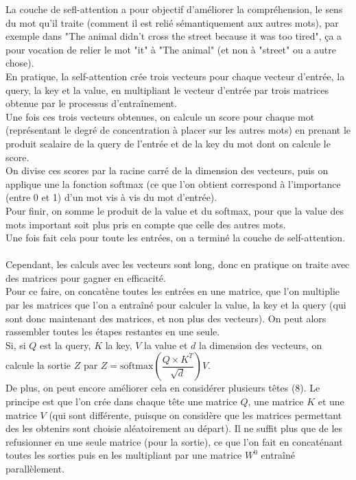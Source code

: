 \documentclass{article}
\begin{document}
La couche de sefl-attention a pour objectif d'améliorer la compréhension, le sens du mot qu'il traite (comment il est relié sémantiquement aux autres mots), par exemple dans "The animal didn’t cross the street because it was too tired", ça a pour vocation de relier le mot "it" à "The animal" (et non à "street" ou a autre chose).\\
En pratique, la self-attention crée trois vecteurs pour chaque vecteur d'entrée, la query, la key et la value, en multipliant le vecteur d'entrée par trois matrices obtenue par le processus d'entraînement.\\
Une fois ces trois vecteurs obtenues, on calcule un score pour chaque mot (représentant le degré de concentration à placer sur les autres mots) en prenant le produit scalaire de la query de l'entrée et de la key du mot dont on calcule le score.\\
On divise ces scores par la racine carré de la dimension des vecteurs, puis on applique une la fonction softmax (ce que l'on obtient correspond à l'importance (entre 0 et 1) d'un mot vis à vis du mot d'entrée).\\
Pour finir, on somme le produit de la value et du softmax, pour que la value des mots important soit plus pris en compte que celle des autres mots.\\
Une fois fait cela pour toute les entrées, on a terminé la couche de self-attention.\\
\\
Cependant, les calculs avec les vecteurs sont long, donc en pratique on traite avec des matrices pour gagner en efficacité.\\
Pour ce faire, on concatène toutes les entrées en une matrice, que l'on multiplie par les matrices que l'on a entraîné pour calculer la value, la key et la query (qui sont donc maintenant des matrices, et non plus des vecteurs). On peut alors rassembler toutes les étapes restantes en une seule.\\
Si, si $Q$ est la query, $K$ la key, $V$ la value et $d$ la dimension des vecteurs, on calcule la sortie $Z$ par $Z = \mathrm{softmax}(\dfrac{Q\times K^T}{\sqrt d})V$.\\
De plus, on peut encore améliorer cela en considérer plusieurs têtes ($8$). Le principe est que l'on crée dans chaque tête une matrice $Q$, une matrice $K$ et une matrice $V$ (qui sont différente, puisque on considère que les matrices permettant des les obtenirs sont choisie aléatoirement au départ). Il ne suffit plus que de les refusionner en une seule matrice (pour la sortie), ce que l'on fait en concaténant toutes les sorties puis en les multipliant par une matrice $W^0$ entraîné parallèlement.\\
\end{document}
